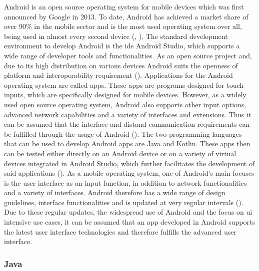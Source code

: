 Android is an open source operating system for mobile devices which was first announced by Google in 2013. To date, Android has achieved a market share of over 90\% in the mobile sector and is the most used operating system over all, being used in almost every second device (\cite{statcounter.2023}, \cite{Richter.2019}). The standard development environment to develop Android is the \ac{ide} Android Studio, which supports a wide range of developer tools and functionalities. As an open source project and, due to its high distribution on various devices Android suits the openness of platform and interoperability requirement (\cite{Richter.2019}). Applications for the Android operating system are called apps. These apps are programs designed for touch inputs, which are specifically designed for mobile devices. However, as a widely used open source operating system, Android also supports other input options, advanced network capabilities and a variety of interfaces and extensions. Thus it can be assumed that the interface and distand communication requirements can be fulfilled through the usage of Android (\cite{Richter.2019}). The two programming languages that can be used to develop Android apps are Java and Kotlin. These apps then can be tested either directly on an Android device or on a variety of virtual devices integrated in Android Studio, which further facilitates the development of said applications (\cite{Richter.2019}). As a mobile operating system, one of Android's main focuses is the user interface as an input function, in addition to network functionalities and a variety of interfaces. Android therefore has a wide range of design guidelines, interface functionalities and is updated at very regular intervals (\cite{statista.2023}). Due to these regular updates, the widespread use of Android and the focus on \ac{ui} intensive use cases, it can be assumed that an app developed in Android supports the latest user interface technologies and therefore fulfills the advanced user interface.


\subsubsection{Java}

